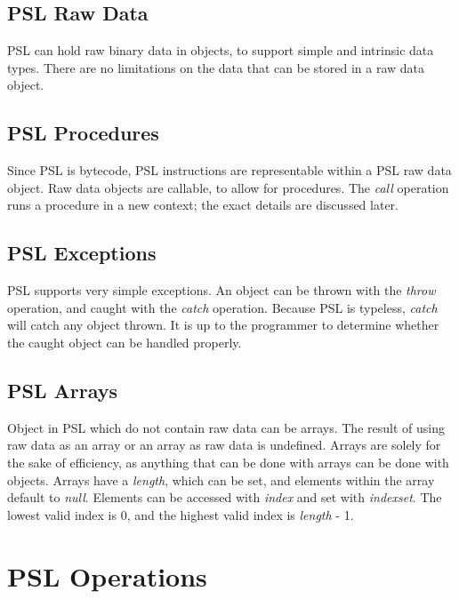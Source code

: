 \subsection{PSL Raw Data}

PSL can hold raw binary data in objects, to support simple and intrinsic data types. There are no limitations on the data that can be stored in a raw data object.



\subsection{PSL Procedures}

Since PSL is bytecode, PSL instructions are representable within a PSL raw data object. Raw data objects are callable, to allow for procedures. The \textit{call} operation runs a procedure in a new context; the exact details are discussed later.



\subsection{PSL Exceptions}

PSL supports very simple exceptions. An object can be thrown with the \textit{throw} operation, and caught with the \textit{catch} operation. Because PSL is typeless, \textit{catch} will catch any object thrown. It is up to the programmer to determine whether the caught object can be handled properly.



\subsection{PSL Arrays}

Object in PSL which do not contain raw data can be arrays. The result of using raw data as an array or an array as raw data is undefined. Arrays are solely for the sake of efficiency, as anything that can be done with arrays can be done with objects. Arrays have a \textit{length}, which can be set, and elements within the array default to \textit{null}. Elements can be accessed with \textit{index} and set with \textit{indexset}. The lowest valid index is 0, and the highest valid index is \textit{length} - 1.



\section{PSL Operations}

